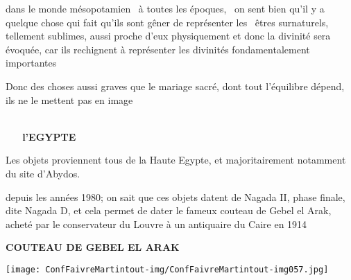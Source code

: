 \documentclass[a4paper]{article}
\begin{document}
{
dans le monde mésopotamien \ à toutes les époques, \ on sent bien qu'il
y a quelque chose qui fait qu'ils sont gêner de représenter les \ êtres
surnaturels, tellement sublimes, aussi proche d'eux physiquement et
donc la divinité sera évoquée, car ils rechignent à représenter les
divinités fondamentalement importantes}

{
Donc des choses aussi graves que le mariage sacré, dont tout l'équilibre
dépend, ils ne le mettent pas en image}


\bigskip


\bigskip


\bigskip


\bigskip


\bigskip


\bigskip


\bigskip


\bigskip


\bigskip


\bigskip

{
\textbf{\ \ \ \ \ \ \ \ \ \ \ \ \ \ \ \ \ \ \ \ \ \ \ \ \ \ \ \ \ \ \ \ \ \ \ \ \ \ \ \ \ \ \ \ \ \ \ \ \ \ \ \ \ \ \ \ \ \ \ \ \ \ \ \ \ l'EGYPTE}}


\bigskip


\bigskip


\bigskip


\bigskip

{
Les objets proviennent tous de la Haute Egypte, et majoritairement
notamment du site d'Abydos.}

{
depuis les années 1980; on sait que ces objets datent de Nagada II,
phase finale, dite Nagada D, et cela permet de dater le fameux couteau
de Gebel el Arak, acheté par le conservateur du Louvre à un antiquaire
du Caire en 1914}


\bigskip


\bigskip


\bigskip

{
\textbf{COUTEAU DE GEBEL EL ARAK\ \ }}


\bigskip


\bigskip


\bigskip


\texttt{[image: ConfFaivreMartintout-img/ConfFaivreMartintout-img057.jpg]}



\bigskip
\end{document}
